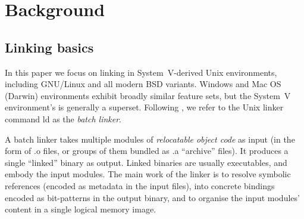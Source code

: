 \section{Background}

% 
% 
% 

\subsection{Linking basics}

In this paper we focus on linking in System~V-derived Unix environments,
including GNU/Linux and all modern BSD variants.
Windows and Mac OS (Darwin) environments exhibit broadly similar feature sets,
but the System~V environment's is generally a superset.
Following \citet{gingell_1987_shared}, we refer to the Unix linker command \textsf{ld}
as the \emph{batch linker}.



A batch linker takes multiple modules of \emph{relocatable object code} 
as input (in the form of \textsf{.o} files, or groups of them bundled as \textsf{.a} ``archive'' files).
It produces a single ``linked'' binary as output.
Linked binaries are usually executables, and embody the input modules.
The main work of the linker is to resolve symbolic references 
(encoded as metadata in the input files), 
into concrete bindings encoded as bit-patterns in the output binary,
and to organise the input modules' content
in a single logical memory image.

